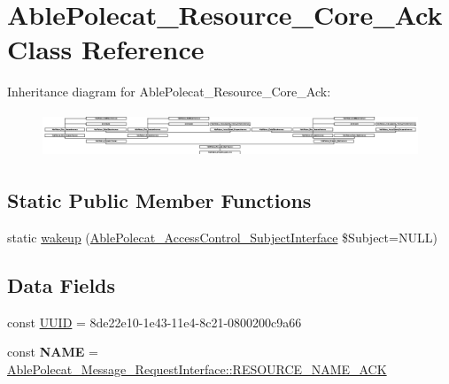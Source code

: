 \hypertarget{class_able_polecat___resource___core___ack}{}\section{Able\+Polecat\+\_\+\+Resource\+\_\+\+Core\+\_\+\+Ack Class Reference}
\label{class_able_polecat___resource___core___ack}
Inheritance diagram for Able\+Polecat\+\_\+\+Resource\+\_\+\+Core\+\_\+\+Ack\+:\begin{figure}[H]
\begin{center}
\leavevmode
\includegraphics[height=1.327913cm]{class_able_polecat___resource___core___ack}
\end{center}
\end{figure}
\subsection*{Static Public Member Functions}
\begin{DoxyCompactItemize}
\item 
static \hyperlink{class_able_polecat___resource___core___ack_a3f2135f6ad45f51d075657f6d20db2cd}{wakeup} (\hyperlink{interface_able_polecat___access_control___subject_interface}{Able\+Polecat\+\_\+\+Access\+Control\+\_\+\+Subject\+Interface} \$Subject=N\+U\+L\+L)
\end{DoxyCompactItemize}
\subsection*{Data Fields}
\begin{DoxyCompactItemize}
\item 
const \hyperlink{class_able_polecat___resource___core___ack_a74b892c8c0b86bf9d04c5819898c51e7}{U\+U\+I\+D} = \textquotesingle{}8de22e10-\/1e43-\/11e4-\/8c21-\/0800200c9a66\textquotesingle{}
\item 
\hypertarget{class_able_polecat___resource___core___ack_a244352f035b82b20b0efa506167fd862}{}const {\bfseries N\+A\+M\+E} = \hyperlink{interface_able_polecat___message___request_interface_aa207fcff72e63e4066e944379ff91baf}{Able\+Polecat\+\_\+\+Message\+\_\+\+Request\+Interface\+::\+R\+E\+S\+O\+U\+R\+C\+E\+\_\+\+N\+A\+M\+E\+\_\+\+A\+C\+K}\label{class_able_polecat___resource___core___ack_a244352f035b82b20b0efa506167fd862}

\end{DoxyCompactItemize}

